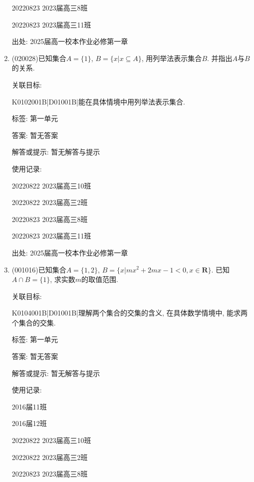 \documentclass[10pt,a4paper]{article}
\begin{document}
\begin{enumerate}[1.]
20220823	2023届高三8班	

20220823	2023届高三11班			


出处: 2025届高一校本作业必修第一章
\item { (020028)}已知集合$A=\{1\}$, $B=\{x|x\subseteq A\}$, 用列举法表示集合$B$. 并指出$A$与$B$的关系.


关联目标:

K0102001B|D01001B|能在具体情境中用列举法表示集合.



标签: 第一单元

答案: 暂无答案

解答或提示: 暂无解答与提示

使用记录:

20220822	2023届高三10班	

20220822	2023届高三2班	

20220823	2023届高三8班	

20220823	2023届高三11班		


出处: 2025届高一校本作业必修第一章
\item { (001016)}已知集合$A=\{1,2\}$, $B=\{x|mx^2+2mx-1<0, x \in\mathbf{R}\}$. 已知$A \cap B=\{1\}$, 求实数$m$的取值范围.


关联目标:

K0104001B|D01001B|理解两个集合的交集的含义, 在具体数学情境中, 能求两个集合的交集.



标签: 第一单元

答案: 暂无答案

解答或提示: 暂无解答与提示

使用记录:

2016届11班	

2016届12班	

20220822	2023届高三10班	

20220822	2023届高三2班	

20220823	2023届高三8班	


\end{enumerate}
\end{document}
